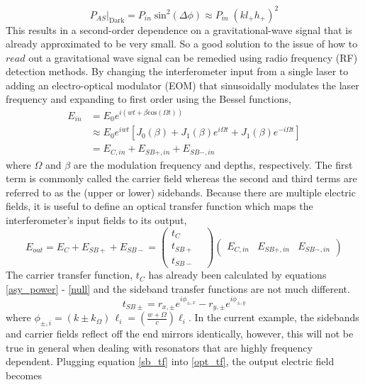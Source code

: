 			\begin{equation}\label{null}
			P_{AS} \vert_{\text{Dark}} = P_{in} \; \text{sin}^2 (\Delta \phi) \approx P_{in} \; (k l_{+} h_{+})^2 
			\end{equation}
		This results in a second-order dependence on a gravitational-wave signal that is already approximated to be very small.  So a good solution to the issue of how to $read$ out a gravitational wave signal can be remedied using radio frequency (RF) detection methods. By changing the interferometer input from a single laser to adding an electro-optical modulator (EOM) that sinusoidally modulates the laser frequency and expanding to first order using the Bessel functions,
			\begin{equation}\label{modE}
			\begin{aligned}
			E_{in} 	&= E_{0} e^{i(wt + \beta \text{cos} (\Omega t))} \\
					&\approx E_0 e^{iwt} [J_0(\beta) + J_1(\beta) e^{i \Omega t} + J_1(\beta) e^{-i \Omega t}] \\
					&= E_{C,in} + E_{SB+,in} + E_{SB-,in}
			\end{aligned}
			\end{equation}
		where $\Omega$ and $\beta$ are the modulation frequency and depths, respectively. The first term is commonly called the carrier field whereas the second and third terms are referred to as the (upper or lower) sidebands.  Because there are multiple electric fields, it is useful to define an optical transfer function which maps the interferometer's input fields to its output,
		\begin{equation}\label{opt_tf}
		E_{out} = E_{C} + E_{SB+} + E_{SB-} = 
		\begin{pmatrix}
			t_{C} 	&   
		\\ 	t_{SB+} &
		\\ 	t_{SB-} &
		\end{pmatrix}
		\begin{pmatrix}
		E_{C,in} &    E_{SB+,in}    &  E_{SB-,in}     
		\end{pmatrix}
		\end{equation}
		The carrier transfer function, $t_{C}$ has already been calculated by equations \ref{asy_power} - \ref{null} and the sideband transfer functions are not much different.
		\begin{equation}\label{sb_tf}
		t_{SB\pm} = r_{x,\pm}  e^{i\phi_{\pm,x}} - r_{y,\pm}  e^{i\phi_{\pm,y}}
		\end{equation}
		where $\phi_{\pm,i} = (k \pm k_{\Omega}) \, \ell_{i} = (\frac{w+\Omega}{c} ) \ell_{i}$. In the current example, the sidebands and carrier fields reflect off the end mirrors identically, however, this will not be true in general when dealing with resonators that are highly frequency dependent.  Plugging equation \ref{sb_tf} into \ref{opt_tf}, the output electric field becomes 
